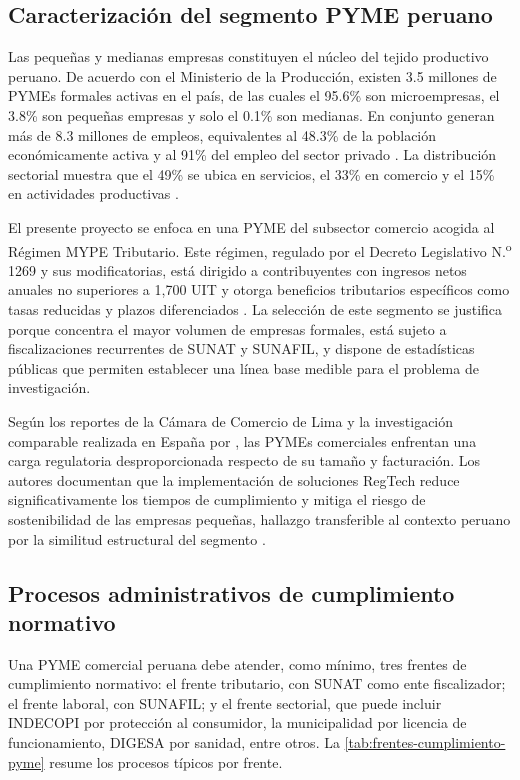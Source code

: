 \documentclass[12pt,a4paper,oneside]{report}
\begin{document}
\subsection{Caracterización del segmento PYME peruano}\label{subsec:caracterizacion-pyme-peruano}

Las pequeñas y medianas empresas constituyen el núcleo del tejido productivo peruano. De acuerdo con el Ministerio de la Producción, existen 3.5 millones de PYMEs formales activas en el país, de las cuales el 95.6\% son microempresas, el 3.8\% son pequeñas empresas y solo el 0.1\% son medianas. En conjunto generan más de 8.3 millones de empleos, equivalentes al 48.3\% de la población económicamente activa y al 91\% del empleo del sector privado \parencite{produce2022}. La distribución sectorial muestra que el 49\% se ubica en servicios, el 33\% en comercio y el 15\% en actividades productivas \parencite{inei2024}.

El presente proyecto se enfoca en una PYME del subsector comercio acogida al Régimen MYPE Tributario. Este régimen, regulado por el Decreto Legislativo N.\textsuperscript{o} 1269 y sus modificatorias, está dirigido a contribuyentes con ingresos netos anuales no superiores a 1,700 UIT y otorga beneficios tributarios específicos como tasas reducidas y plazos diferenciados \parencite{decreto1269}. La selección de este segmento se justifica porque concentra el mayor volumen de empresas formales, está sujeto a fiscalizaciones recurrentes de SUNAT y SUNAFIL, y dispone de estadísticas públicas que permiten establecer una línea base medible para el problema de investigación.

Según los reportes de la Cámara de Comercio de Lima y la investigación comparable realizada en España por \textcite{cruzrambaud2022}, las PYMEs comerciales enfrentan una carga regulatoria desproporcionada respecto de su tamaño y facturación. Los autores documentan que la implementación de soluciones RegTech reduce significativamente los tiempos de cumplimiento y mitiga el riesgo de sostenibilidad de las empresas pequeñas, hallazgo transferible al contexto peruano por la similitud estructural del segmento \parencite{camaradecomerciodelima2025}.

\subsection{Procesos administrativos de cumplimiento normativo}\label{subsec:procesos-administrativos-cumplimiento}

Una PYME comercial peruana debe atender, como mínimo, tres frentes de cumplimiento normativo: el frente tributario, con SUNAT como ente fiscalizador; el frente laboral, con SUNAFIL; y el frente sectorial, que puede incluir INDECOPI por protección al consumidor, la municipalidad por licencia de funcionamiento, DIGESA por sanidad, entre otros. La \cref{tab:frentes-cumplimiento-pyme} resume los procesos típicos por frente.
\end{document}
